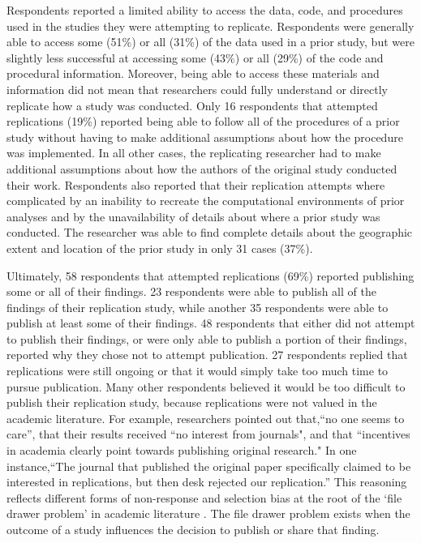\documentclass[]{interact}
\theoremstyle{plain}%
\theoremstyle{definition}
\theoremstyle{remark}
\begin{document}
Respondents reported a limited ability to access the data, code, and procedures used in the studies they were attempting to replicate. 
Respondents were generally able to access some (51\%) or all (31\%) of the data used in a prior study, but were slightly less successful at accessing some (43\%) or all (29\%) of the code and procedural information.
Moreover, being able to access these materials and information did not mean that researchers could fully understand or directly replicate how a study was conducted.
Only 16 respondents that attempted replications (19\%) reported being able to follow all of the procedures of a prior study without having to make additional assumptions about how the procedure was implemented. 
In all other cases, the replicating researcher had to make additional assumptions about how the authors of the original study conducted their work.
Respondents also reported that their replication attempts where complicated by an inability to recreate the computational environments of prior analyses and by the unavailability of details about where a prior study was conducted.
The researcher was able to find complete details about the geographic extent and location of the prior study in only 31 cases (37\%).

Ultimately, 58 respondents that attempted replications (69\%) reported publishing some or all of their findings.
23 respondents were able to publish all of the findings of their replication study, while another 35 respondents were able to publish at least some of their findings.
48 respondents that either did not attempt to publish their findings, or were only able to publish a portion of their findings, reported why they chose not to attempt publication. 
27 respondents replied that replications were still ongoing or that it would simply take too much time to pursue publication. 
Many other respondents believed it would be too difficult to publish their replication study, because replications were not valued in the academic literature.
For example, researchers pointed out that,``no one seems to care'', that their results received ``no interest from journals", and that ``incentives in academia clearly point towards publishing original research."
In one instance,``The journal that published the original paper specifically claimed to be interested in replications, but then desk rejected our replication.''
This reasoning reflects different forms of non-response and selection bias at the root of the `file drawer problem' in academic literature \citep{rosenthal1979}. 
The file drawer problem exists when the outcome of a study influences the decision to publish or share that finding. 
\end{document}
